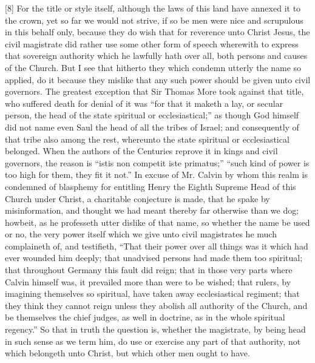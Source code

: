 [8] For the title or style itself, although the laws of this land have annexed it to the crown, yet so far we would not strive, if so be men were nice and scrupulous in this behalf only, because they do wish that for reverence unto Christ Jesus, the civil magistrate did rather use some other form of speech wherewith to express that sovereign authority which  he lawfully hath over all, both persons and causes of the Church. But I see that hitherto they which condemn utterly the name so applied, do it because they mislike that any such power should be given unto civil governors. The greatest exception that Sir Thomas More took against that title, who suffered death for denial of it was “for that it maketh a lay, or secular person, the head of the state spiritual or ecclesiastical;” as though God himself did not name even Saul the head of all the tribes of Israel; and consequently of that tribe also among the rest, whereunto the state spiritual or ecclesiastical belonged. When the authors of the Centuries reprove it in kings and civil governors, the reason is “istis non competit iste primatus;” “such kind of power is too high for them, they fit it not.” In excuse of Mr. Calvin by whom this realm is condemned of blasphemy for entitling Henry the Eighth Supreme Head of this Church under Christ, a charitable conjecture is made, that he spake by misinformation, and thought we had meant thereby far otherwise than we dog; howbeit, as he professeth utter dislike of that name, so whether the name be used or no, the very power itself which we give unto civil magistrates he much complaineth of,  and testifieth, “That their power over all things was it which had ever wounded him deeply; that unadvised persons had made them too spiritual; that throughout Germany this fault did reign; that in those very parts where Calvin himself was, it prevailed more than were to be wished; that rulers, by imagining themselves so spiritual, have taken away ecclesiastical regiment; that they think they cannot reign unless they abolish all authority of the Church, and be themselves the chief judges, as well in doctrine, as in the whole spiritual regency.” So that in truth the question is, whether the magistrate, by being head in such sense as we term him, do use or exercise any part of that authority, not which belongeth unto Christ, but which other men ought to have.

